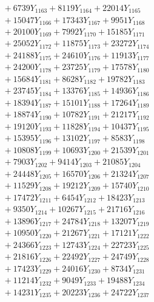 \documentclass[a4paper,10pt]{article}
\begin{document}
{\begin{align}
&\;  + 6739 Y_{1163} + 8119 Y_{1164} + 22014 Y_{1165} \\[0.3ex]
&\;  + 15047 Y_{1166} + 17343 Y_{1167} + 9951 Y_{1168} \\[0.5ex]\allowbreak
&\;  + 20100 Y_{1169} + 7992 Y_{1170} + 15185 Y_{1171} \\[0.3ex]
&\;  + 25052 Y_{1172} + 11875 Y_{1173} + 23272 Y_{1174} \\[0.3ex]
&\;  + 24188 Y_{1175} + 24610 Y_{1176} + 11913 Y_{1177} \\[0.3ex]
&\;  + 24200 Y_{1178} + 23725 Y_{1179} + 17578 Y_{1180} \\[0.3ex]
&\;  + 15684 Y_{1181} + 8628 Y_{1182} + 19782 Y_{1183} \\[0.3ex]
&\;  + 23745 Y_{1184} + 13376 Y_{1185} + 14936 Y_{1186} \\[0.3ex]
&\;  + 18394 Y_{1187} + 15101 Y_{1188} + 17264 Y_{1189} \\[0.3ex]
&\;  + 18874 Y_{1190} + 10782 Y_{1191} + 21217 Y_{1192} \\[0.3ex]
&\;  + 19120 Y_{1193} + 11828 Y_{1194} + 10437 Y_{1195} \\[0.3ex]
&\;  + 15395 Y_{1196} + 13102 Y_{1197} + 8583 Y_{1198} \\[0.5ex]\allowbreak
&\;  + 10808 Y_{1199} + 10693 Y_{1200} + 21539 Y_{1201} \\[0.3ex]
&\;  + 7903 Y_{1202} + 9414 Y_{1203} + 21085 Y_{1204} \\[0.3ex]
&\;  + 24448 Y_{1205} + 16570 Y_{1206} + 21324 Y_{1207} \\[0.3ex]
&\;  + 11529 Y_{1208} + 19212 Y_{1209} + 15740 Y_{1210} \\[0.3ex]
&\;  + 17472 Y_{1211} + 6454 Y_{1212} + 18423 Y_{1213} \\[0.3ex]
&\;  + 9350 Y_{1214} + 10267 Y_{1215} + 21716 Y_{1216} \\[0.3ex]
&\;  + 13896 Y_{1217} + 24784 Y_{1218} + 13207 Y_{1219} \\[0.3ex]
&\;  + 10950 Y_{1220} + 21267 Y_{1221} + 17121 Y_{1222} \\[0.3ex]
&\;  + 24366 Y_{1223} + 12743 Y_{1224} + 22723 Y_{1225} \\[0.3ex]
&\;  + 21816 Y_{1226} + 22492 Y_{1227} + 24749 Y_{1228} \\[0.5ex]\allowbreak
&\;  + 17423 Y_{1229} + 24016 Y_{1230} + 8734 Y_{1231} \\[0.3ex]
&\;  + 11214 Y_{1232} + 9049 Y_{1233} + 19488 Y_{1234} \\[0.3ex]
&\;  + 14231 Y_{1235} + 20223 Y_{1236} + 24722 Y_{1237} \\[0.3ex]

\end{align}}
\end{document}
